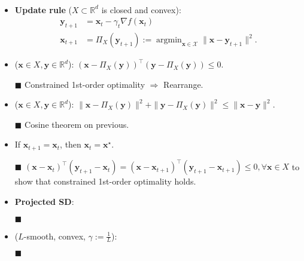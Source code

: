 \documentclass[a4paper]{article}
\DeclareMathOperator*{\argmin}{argmin}
\newcommand{\R}{\mathbb{R}}
\renewcommand{\vec}[1]{\mathbf{#1}}
\newcommand{\proofsquare}{$\blacksquare$}
\newenvironment{topic}[1]
{\textbf{\sffamily \colorbox{black}{\rlap{\textbf{\textcolor{white}{#1}}}\hspace{\linewidth}\hspace{-2\fboxsep}}} \\ \vspace{0.2cm}}
{}
\begin{document}
\begin{multicols*}{2}
    \begin{topic}{Projected gradient descent}
        \begin{itemize}
            \item \textbf{Update rule} ($X \subset \R^d$ is closed and convex):
                  \begin{align*}
                      \vec{y}_{t+1} & = \vec{x}_t - \gamma_t \nabla f(\vec{x}_t)                                                   \\
                      \vec{x}_{t+1} & = \Pi_X(\vec{y}_{t+1}) := \argmin_{\vec{x} \in \mathcal{X}} \| \vec{x} - \vec{y}_{t+1} \|^2.
                  \end{align*}
            \item ($\vec{x} \in X, \vec{y} \in \R^d$): $(\vec{x} - \Pi_X(\vec{y}))^\top (\vec{y} - \Pi_X(\vec{y})) \leq 0$.
            \item[\proofsquare] Constrained 1st-order optimality $\Rightarrow$ Rearrange.
            \item ($\vec{x} \in X, \vec{y} \in \R^d$): $\| \vec{x} - \Pi_X(\vec{y}) \|^2 + \| \vec{y} - \Pi_X(\vec{y}) \|^2 \leq \| \vec{x} - \vec{y} \|^2$.
            \item[\proofsquare] Cosine theorem on previous.
            \item If $\vec{x}_{t+1} = \vec{x}_t$, then $\vec{x}_t = \vec{x}^\star$.
            \item[\proofsquare] $(\vec{x} - \vec{x}_t)^\top (\vec{y}_{t+1} - \vec{x}_t) = (\vec{x} - \vec{x}_{t+1})^\top (\vec{y}_{t+1} - \vec{x}_{t+1}) \leq 0, \forall \vec{x} \in X$ to show that constrained 1st-order optimality holds.
            \item \textbf{Projected SD}:
            \item[\proofsquare]
            \item ($L$-smooth, convex, $\gamma := \frac{1}{L}$):
            \item[\proofsquare]
        \end{itemize}
    \end{topic}


\end{multicols*}
\end{document}
